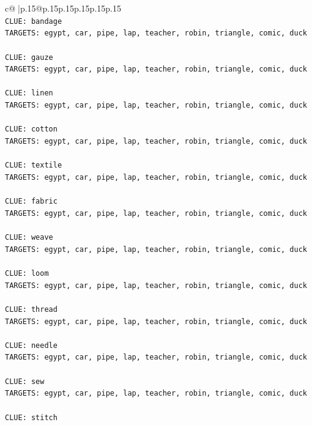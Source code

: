\documentclass{article}
\begin{document}
{\begin{supertabular}{c@{$\;$}|p{.15\linewidth}@{}p{.15\linewidth}p{.15\linewidth}p{.15\linewidth}p{.15\linewidth}p{.15\linewidth}}
{{{\\ 
\texttt{CLUE: bandage} \\
\texttt{TARGETS: egypt, car, pipe, lap, teacher, robin, triangle, comic, duck} \\
\\ 
\texttt{CLUE: gauze} \\
\texttt{TARGETS: egypt, car, pipe, lap, teacher, robin, triangle, comic, duck} \\
\\ 
\texttt{CLUE: linen} \\
\texttt{TARGETS: egypt, car, pipe, lap, teacher, robin, triangle, comic, duck} \\
\\ 
\texttt{CLUE: cotton} \\
\texttt{TARGETS: egypt, car, pipe, lap, teacher, robin, triangle, comic, duck} \\
\\ 
\texttt{CLUE: textile} \\
\texttt{TARGETS: egypt, car, pipe, lap, teacher, robin, triangle, comic, duck} \\
\\ 
\texttt{CLUE: fabric} \\
\texttt{TARGETS: egypt, car, pipe, lap, teacher, robin, triangle, comic, duck} \\
\\ 
\texttt{CLUE: weave} \\
\texttt{TARGETS: egypt, car, pipe, lap, teacher, robin, triangle, comic, duck} \\
\\ 
\texttt{CLUE: loom} \\
\texttt{TARGETS: egypt, car, pipe, lap, teacher, robin, triangle, comic, duck} \\
\\ 
\texttt{CLUE: thread} \\
\texttt{TARGETS: egypt, car, pipe, lap, teacher, robin, triangle, comic, duck} \\
\\ 
\texttt{CLUE: needle} \\
\texttt{TARGETS: egypt, car, pipe, lap, teacher, robin, triangle, comic, duck} \\
\\ 
\texttt{CLUE: sew} \\
\texttt{TARGETS: egypt, car, pipe, lap, teacher, robin, triangle, comic, duck} \\
\\ 
\texttt{CLUE: stitch} \\
}}}
\end{supertabular}}
\end{document}
